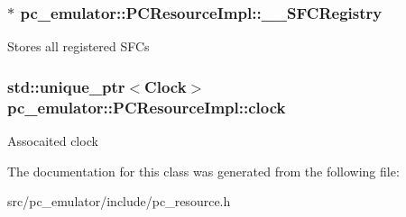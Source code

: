 \subsubsection[{\texorpdfstring{\+\_\+\+\_\+\+S\+F\+C\+Registry}{__SFCRegistry}}]{$\ast$ pc\+\_\+emulator\+::\+P\+C\+Resource\+Impl\+::\+\_\+\+\_\+\+S\+F\+C\+Registry}\hypertarget{classpc__emulator_1_1PCResourceImpl_ab0fadc7735b85b999570f02b8543bdab}{}\label{classpc__emulator_1_1PCResourceImpl_ab0fadc7735b85b999570f02b8543bdab}
Stores all registered S\+F\+Cs 
\subsubsection[{\texorpdfstring{clock}{clock}}]{\setlength{\rightskip}{0pt plus 5cm}std\+::unique\+\_\+ptr$<${\bf Clock}$>$ pc\+\_\+emulator\+::\+P\+C\+Resource\+Impl\+::clock}\hypertarget{classpc__emulator_1_1PCResourceImpl_ad49b0d4eb79f506f03f37518e1e70d1e}{}\label{classpc__emulator_1_1PCResourceImpl_ad49b0d4eb79f506f03f37518e1e70d1e}
Assocaited clock 

The documentation for this class was generated from the following file\+:\begin{DoxyCompactItemize}
\item 
src/pc\+\_\+emulator/include/pc\+\_\+resource.\+h\end{DoxyCompactItemize}

